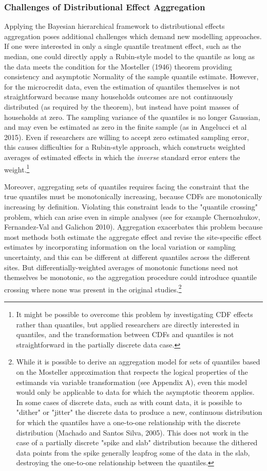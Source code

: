 \documentclass[AER]{AEA}
\begin{document}
\subsubsection{Challenges of Distributional Effect Aggregation}
Applying the Bayesian hierarchical framework to distributional effects aggregation poses additional challenges which demand new modelling approaches. If one were interested in only a single quantile treatment effect, such as the median, one could directly apply a Rubin-style model to the quantile as long as the data meets the condition for the Mosteller (1946) theorem providing consistency and asymptotic Normality of the sample quantile estimate. However, for the microcredit data, even the estimation of quantiles themselves is not straightforward because many households outcomes are not continuously distributed (as required by the theorem), but instead have point masses of households at zero. The sampling variance of the quantiles is no longer Gaussian, and may even be estimated as zero in the finite sample (as in Angelucci et al 2015). Even if researchers are willing to accept zero estimated sampling error, this causes difficulties for a Rubin-style approach, which constructs weighted averages of estimated effects in which the \emph{inverse} standard error enters the weight.\footnote{It might be possible to overcome this problem by investigating CDF effects rather than quantiles, but applied researchers are directly interested in quantiles, and the transformation between CDFs and quantiles is not straightforward in the partially discrete data case.}

Moreover, aggregating sets of quantiles requires facing the constraint that the true quantiles must be monotonically increasing, because CDFs are monotonically increasing by definition. Violating this constraint leads to the "quantile crossing" problem, which can arise even in simple analyses (see for example Chernozhukov, Fernandez-Val and Galichon 2010). Aggregation exacerbates this problem because most methods both estimate the aggregate effect and revise the site-specific effect estimates by incorporating information on the local variation or sampling uncertainty, and this can be different at different quantiles across the different sites.  But differentially-weighted averages of monotonic functions need not themselves be monotonic, so the aggregation procedure could introduce quantile crossing where none was present in the original studies.\footnote{While it is possible to derive an aggregation model for sets of quantiles based on the Mosteller approximation that respects the logical properties of the estimands via variable transformation (see Appendix A), even this model would only be applicable to data for which the asymptotic theorem applies. In some cases of discrete data, such as with count data, it is possible to "dither" or "jitter" the discrete data to produce a new, continuous distribution for which the quantiles have a one-to-one relationship with the discrete distribution (Machado and Santos Silva, 2005). This does not work in the case of a partially discrete "spike and slab" distribution because the dithered data points from the spike generally leapfrog some of the data in the slab, destroying the one-to-one relationship between the quantiles.}
\end{document}
